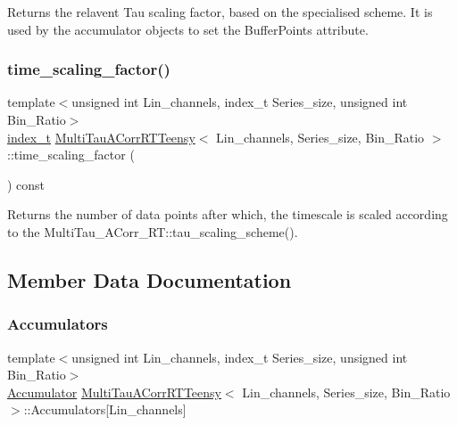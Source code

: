 Returns the relavent Tau scaling factor, based on the specialised scheme. It is used by the accumulator objects to set the Buffer\+Points attribute. 

\mbox{\label{classMultiTauACorrRTTeensy_a56fbc9bf757ac74e0dad862ec45def82}} 
\subsubsection{\texorpdfstring{time\+\_\+scaling\+\_\+factor()}{time\_scaling\_factor()}}
{\footnotesize\ttfamily template$<$unsigned int Lin\+\_\+channels, index\+\_\+t Series\+\_\+size, unsigned int Bin\+\_\+\+Ratio$>$ \\
\hyperlink{types_8hpp_ab41b824af8e088d090c0b9e60f536c9d}{index\+\_\+t} \hyperlink{classMultiTauACorrRTTeensy}{Multi\+Tau\+A\+Corr\+R\+T\+Teensy}$<$ Lin\+\_\+channels, Series\+\_\+size, Bin\+\_\+\+Ratio $>$\+::time\+\_\+scaling\+\_\+factor (\begin{DoxyParamCaption}{ }\end{DoxyParamCaption}) const\hspace{0.3cm}{\ttfamily [inline]}}

Returns the number of data points after which, the timescale is scaled according to the Multi\+Tau\+\_\+\+A\+Corr\+\_\+\+R\+T\+::tau\+\_\+scaling\+\_\+scheme(). 

\subsection{Member Data Documentation}
\mbox{\label{classMultiTauACorrRTTeensy_aac3d87dfb6b995e83e20f444d3d5eb0d}} 
\subsubsection{\texorpdfstring{Accumulators}{Accumulators}}
{\footnotesize\ttfamily template$<$unsigned int Lin\+\_\+channels, index\+\_\+t Series\+\_\+size, unsigned int Bin\+\_\+\+Ratio$>$ \\
\hyperlink{classAccumulator}{Accumulator} \hyperlink{classMultiTauACorrRTTeensy}{Multi\+Tau\+A\+Corr\+R\+T\+Teensy}$<$ Lin\+\_\+channels, Series\+\_\+size, Bin\+\_\+\+Ratio $>$\+::Accumulators\mbox{[}Lin\+\_\+channels\mbox{]}\hspace{0.3cm}{\ttfamily [private]}}



